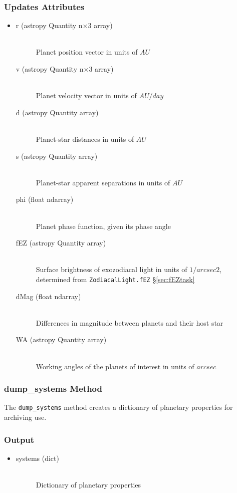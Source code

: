 \documentclass[cleanfoot]{asme2ej}
\begin{document}
\subsubsection*{Updates Attributes}
\begin{itemize}
\item
\begin{description}
    \item[r (astropy Quantity n$\times$3 array)] \hfill \\ Planet position vector in units of $ AU $
    \item[v (astropy Quantity n$\times$3 array)] \hfill \\ Planet velocity vector in units of $ AU/day $
    \item[d (astropy Quantity array)] \hfill \\ Planet-star distances in units of $ AU $
    \item[s (astropy Quantity array)] \hfill \\ Planet-star apparent separations in units of $ AU $
    \item[phi (float ndarray)] \hfill \\ Planet phase function, given its phase angle
    \item[fEZ (astropy Quantity array)] \hfill \\ Surface brightness of exozodiacal light in units of $ 1/arcsec2 $, determined from \verb+ZodiacalLight.fEZ+ \S\ref{sec:fEZtask}
    \item[dMag (float ndarray)] \hfill \\ Differences in magnitude between planets and their host star
    \item[WA (astropy Quantity array)] \hfill \\ Working angles of the planets of interest in units of $arcsec$
\end{description}
\end{itemize}

\subsubsection{dump\_systems Method} \label{sec:dumpsystemstask}
The \verb+dump_systems+ method creates a dictionary of planetary properties for archiving use.
\subsubsection*{Output}
\begin{itemize}
\item 
\begin{description}
    \item[systems (dict)] \hfill \\ Dictionary of planetary properties
\end{description}
\end{itemize}
\end{document}
